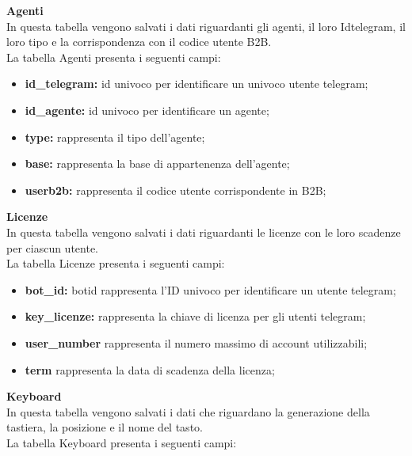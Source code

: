 \textbf{Agenti}\\

In questa tabella vengono salvati i dati riguardanti gli agenti, il loro Idtelegram, il loro tipo e la corrispondenza con il codice utente B2B.\\

La tabella Agenti presenta i seguenti campi:\\

\begin{itemize}
\item \textbf{id\_telegram:}  id univoco per identificare un univoco utente telegram;
\item \textbf{id\_agente:}  id univoco per identificare un agente;
\item \textbf{type:} rappresenta il tipo dell’agente;
\item \textbf{base:} rappresenta la base di appartenenza dell’agente;
\item \textbf{userb2b:} rappresenta il codice utente corrispondente in B2B;
\end{itemize}



\textbf{Licenze}
\\
In questa tabella vengono salvati i dati riguardanti le licenze con le loro scadenze per ciascun utente.\\

La tabella Licenze presenta i seguenti campi:

\begin{itemize}
\item \textbf{bot\_id:}  botid rappresenta l’ID univoco per identificare un utente telegram;
\item \textbf{key\_licenze:} rappresenta la chiave di licenza per gli utenti telegram;
\item \textbf{user\_number } rappresenta il numero massimo di account utilizzabili;
\item \textbf{term} rappresenta la data di scadenza della licenza;
\end{itemize}




\textbf{Keyboard}\\

In questa tabella vengono salvati i dati che riguardano la generazione della tastiera, la posizione e il nome del tasto.\\

La tabella Keyboard presenta i seguenti campi:\\

